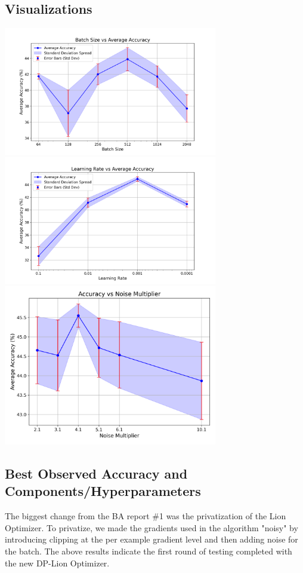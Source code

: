 \subsection{Visualizations}\label{subsec:best-accuracy-viz2}
\includegraphics[width=0.7\textwidth]{batch_size_vs_accuracy.png}
\includegraphics[width=0.7\textwidth]{learning_rate_vs_accuracy.png}
\includegraphics[width=0.7\textwidth]{Accuracy vs Noise Multiplier.png}

\subsection{Best Observed Accuracy and Components/Hyperparameters}\label{subsec:best-accuracy}
The biggest change from the BA report \#1 was the privatization of the Lion Optimizer. To privatize, we made the gradients used in the algorithm "noisy" by introducing clipping
at the per example gradient level and then adding noise for the batch. The above results indicate the first round of testing completed with the new DP-Lion Optimizer.

